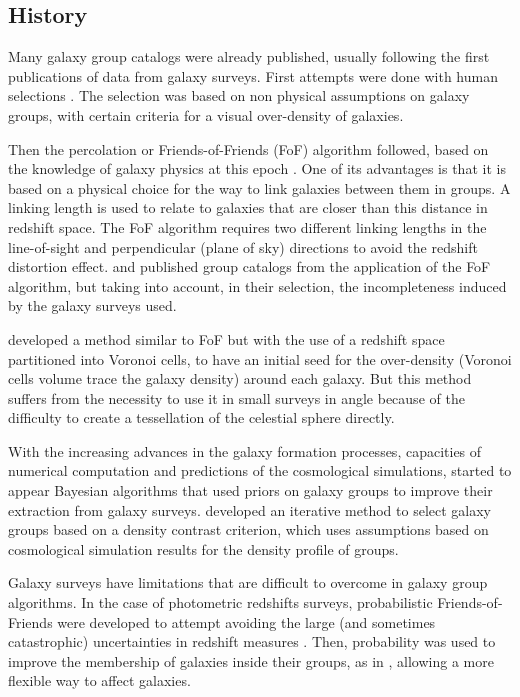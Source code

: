 \subsection{History}
\label{sub:history}

Many galaxy group catalogs were already published, usually following the first
publications of data from galaxy surveys. First attempts were done with human
selections \citep{Abell+58,Zwicky+61,Rose+76}. The selection was based on non
physical assumptions on galaxy groups, with certain criteria for a visual
over-density of galaxies.

Then the percolation or Friends-of-Friends (FoF) algorithm followed, based on
the knowledge of galaxy physics at this epoch \citep{Huchra+82,NW87}. One of
its advantages is that it is based on a physical choice for the way to link
galaxies between them in groups. A linking length is used to relate to galaxies
that are closer than this distance in redshift space. The FoF algorithm
requires two different linking lengths in the line-of-sight and perpendicular
(plane of sky) directions to avoid the redshift distortion effect.
\citet{Eke+04} and \citet{Berlind+06} published group catalogs from the
application of the FoF algorithm, but taking into account, in their selection,
the incompleteness induced by the galaxy surveys used.

\citet{Marinoni+02} developed a method similar to FoF but with the use of a
redshift space partitioned into Voronoi cells, to have an initial seed for the
over-density (Voronoi cells volume trace the galaxy density) around each
galaxy. But this method suffers from the necessity to use it in small surveys
in angle because of the difficulty to create a tessellation of the celestial
sphere directly.

With the increasing advances in the galaxy formation processes, capacities of
numerical computation and predictions of the cosmological simulations, started
to appear Bayesian algorithms that used priors on galaxy groups to improve
their extraction from galaxy surveys. \citet{Yang+05,Yang+07} developed an
iterative method to select galaxy groups based on a density contrast criterion,
which uses assumptions based on cosmological simulation results for the density
profile of groups.

Galaxy surveys have limitations that are difficult to overcome in galaxy group
algorithms. In the case of photometric redshifts surveys, probabilistic
Friends-of-Friends were developed to attempt avoiding the large (and sometimes
catastrophic) uncertainties in redshift measures \citep{Liu+08}. Then,
probability was used to improve the membership of galaxies inside their groups,
as in \citet{DominguezRomero+12}, allowing a more flexible way to affect
galaxies.

